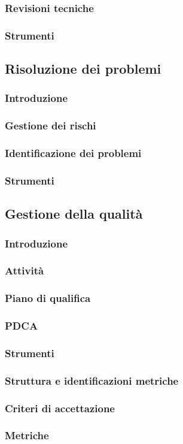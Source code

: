 \subsubsection{Revisioni tecniche}
\subsubsection{Strumenti}


\subsection{Risoluzione dei problemi}
\subsubsection{Introduzione}
\subsubsection{Gestione dei rischi}
\subsubsection{Identificazione dei problemi}
\subsubsection{Strumenti}


\subsection{Gestione della qualità}
\subsubsection{Introduzione}
\subsubsection{Attività}
\subsubsection{Piano di qualifica}
\subsubsection{PDCA}
\subsubsection{Strumenti}
\subsubsection{Struttura e identificazioni metriche}
\subsubsection{Criteri di accettazione}
\subsubsection{Metriche}
